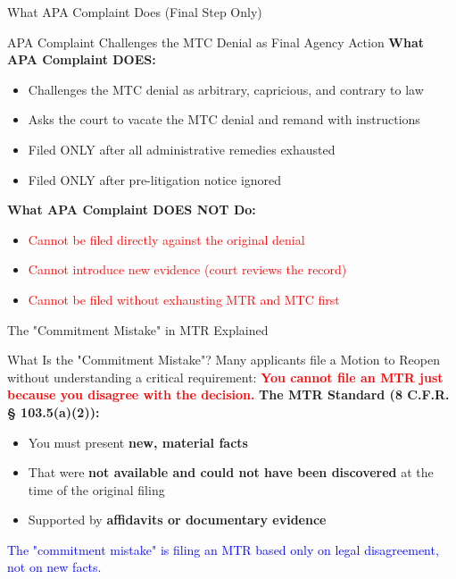 \documentclass[11pt]{beamer}
\begin{document}
	\begin{frame}{What APA Complaint Does (Final Step Only)}
		\scriptsize
		\begin{block}{APA Complaint Challenges the MTC Denial as Final Agency Action}
			\textbf{What APA Complaint DOES:}
			\begin{itemize}
				\item Challenges the MTC denial as arbitrary, capricious, and contrary to law
				\item Asks the court to vacate the MTC denial and remand with instructions
				\item Filed ONLY after all administrative remedies exhausted
				\item Filed ONLY after pre-litigation notice ignored
			\end{itemize}
			\textbf{What APA Complaint DOES NOT Do:}
			\begin{itemize}
				\item \textcolor{red}{Cannot be filed directly against the original denial}
				\item \textcolor{red}{Cannot introduce new evidence (court reviews the record)}
				\item \textcolor{red}{Cannot be filed without exhausting MTR and MTC first}
			\end{itemize}
		\end{block}
	\end{frame}
	
	\begin{frame}{The "Commitment Mistake" in MTR Explained}
		\scriptsize
		\begin{block}{What Is the "Commitment Mistake"?}
			Many applicants file a Motion to Reopen without understanding a critical requirement:
			\vspace{0.2cm}
			\textcolor{red}{\textbf{You cannot file an MTR just because you disagree with the decision.}}
			\vspace{0.2cm}
			\textbf{The MTR Standard (8 C.F.R. § 103.5(a)(2)):}
			\begin{itemize}
				\item You must present \textbf{new, material facts}
				\item That were \textbf{not available and could not have been discovered} at the time of the original filing
				\item Supported by \textbf{affidavits or documentary evidence}
			\end{itemize}
			\textcolor{blue}{The "commitment mistake" is filing an MTR based only on legal disagreement, not on new facts.}
		\end{block}
	\end{frame}
	
\end{document}
